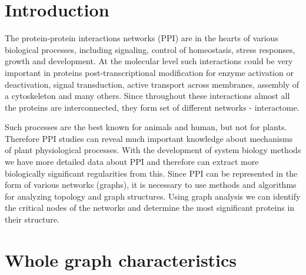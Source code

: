 \documentclass[a0,portrait]{a0poster}
\begin{document}
\begin{multicols}{2} %


\color{SaddleBrown} %

\section*{Introduction}

The protein-protein interactions networks (PPI) are in the hearts of various biological processes, including signaling, control of homeostasis, stress responses, growth and development. At the molecular level such interactions could be very important in proteins post-transcriptional modification for enzyme activation or deactivation, signal transduction, active transport across membranes, assembly of a cytoskeleton and many others. Since throughout these interactions almost all the proteins are interconnected, they form set of different networks - interactome.

Such processes are the best known for animals and human, but not for plants. Therefore PPI studies can reveal much important knowledge about mechanisms of plant physiological processes. With the development of system biology methods we have more detailed data about PPI and therefore can extract more biologically significant regularities from this. Since PPI can be represented in the form of various networks (graphs), it is necessary to use methods and algorithms for analyzing topology and graph structures. Using graph analysis we can identify the critical nodes of the networks and determine the most significant proteins in their structure.

%
\color{DarkSlateGray} %


\section*{Whole graph characteristics}


\end{multicols}
\end{document}

